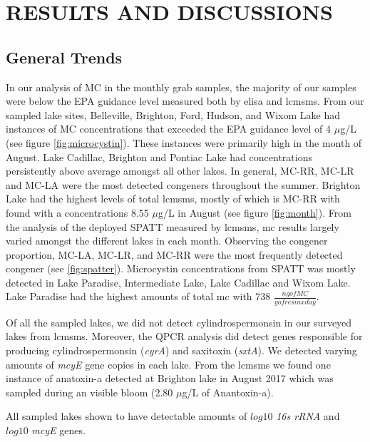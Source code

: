 \chapter{RESULTS AND DISCUSSIONS}
\section{General Trends}

In our analysis of MC in the monthly grab samples, the majority of our samples were below the EPA guidance level measured both by \gls{elisa} and \gls{lcmsms}. From our sampled lake sites, Belleville, Brighton, Ford, Hudson, and Wixom Lake had instances of MC concentrations that exceeded the EPA guidance level of 4 $\mu$g/L  (see figure \ref{fig:microcystin}). These instances were primarily high in the month of August. Lake Cadillac, Brighton and Pontiac Lake had concentrations persistently above average amongst all other lakes. In general, MC-RR, MC-LR and MC-LA were the most detected congeners throughout the summer. Brighton Lake had the highest levels of total \gls{lcmsms}, mostly of which is MC-RR with found with a concentrations 8.55 $\mu$g/L in August (see figure \ref{fig:month}). From the analysis of the deployed SPATT measured by \gls{lcmsms}, \gls{mc} results largely varied amongst the different lakes in each month. Observing the congener proportion, MC-LA, MC-LR, and MC-RR were the most frequently detected congener (see \ref{fig:spatter}). Microcystin concentrations from SPATT was mostly detected in Lake Paradise, Intermediate Lake, Lake Cadillac and Wixom Lake. Lake Paradise had the highest amounts of total \gls{mc} with 738 $\frac{ng of MC}{g of resin x day}$.  

Of all the sampled lakes, we did not detect cylindrospermonsin in our surveyed lakes from \gls{lcmsms}. Moreover, the QPCR analysis did detect genes responsible for producing cylindrospermonsin (\emph{cyrA}) and saxitoxin (\emph{sxtA}). We detected varying amounts of \emph{mcyE} gene copies in each lake.  From the \gls{lcmsms} we found one instance of anatoxin-a detected at Brighton lake in August 2017 which was sampled during an visible bloom (2.80 $\mu$g/L of Anantoxin-a).

All sampled lakes shown to have detectable amounts of $log10$ \emph{16s rRNA} and $log10$ \emph{mcyE} genes. 

